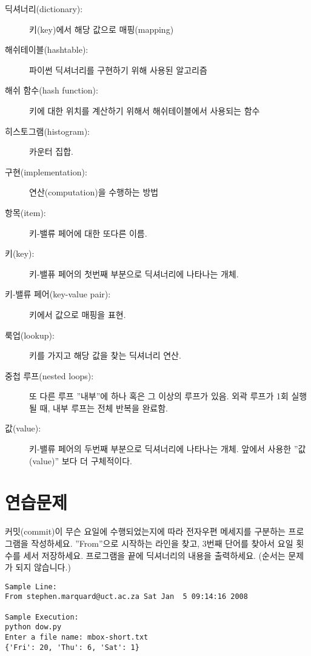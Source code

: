 \begin{description}

\item[딕셔너리(dictionary):] 키(key)에서 해당 값으로 매핑(mapping)

\item[해쉬테이블(hashtable):] 파이썬 딕셔너리를 구현하기 위해 사용된 알고리즘

\item[해쉬 함수(hash function):] 키에 대한 위치를 계산하기 위해서 해쉬테이블에서 사용되는 함수

\item[히스토그램(histogram):] 카운터 집합.

\item[구현(implementation):] 연산(computation)을 수행하는 방법

\item[항목(item):] 키-밸류 페어에 대한 또다른 이름.

\item[키(key):] 키-밸퓨 페어의 첫번째 부분으로 딕셔너리에 나타나는 개체.

\item[키-밸류 페어(key-value pair):] 키에서 값으로 매핑을 표현.

\item[룩업(lookup):] 키를 가지고 해당 값을 찾는 딕셔너리 연산.

\item[중첩 루프(nested loops):]
또 다른 루프 ''내부''에 하나 혹은 그 이상의 루프가 있음. 외곽 루프가 1회 실행될 때, 내부 루프는 전체 반복을 완료함.

\item[값(value):] 키-밸류 페어의 두번째 부분으로 딕셔너리에 나타나는 개체. 앞에서 사용한 ''값(value)'' 보다 더 구체적이다.

\end{description}

\section{연습문제}

\begin{ex}

커밋(commit)이 무슨 요일에 수행되었는지에 따라 전자우편 메세지를 구분하는 프로그램을 작성하세요.
''From''으로 시작하는 라인을 찾고, 3번째 단어를 찾아서 요일 횟수를 세서 저장하세요.
프로그램을 끝에 딕셔너리의 내용을 출력하세요. (순서는 문제가 되지 않습니다.)

\beforeverb
\begin{verbatim}
Sample Line:
From stephen.marquard@uct.ac.za Sat Jan  5 09:14:16 2008

Sample Execution:
python dow.py
Enter a file name: mbox-short.txt
{'Fri': 20, 'Thu': 6, 'Sat': 1}
\end{verbatim}
\afterverb
\end{ex}

